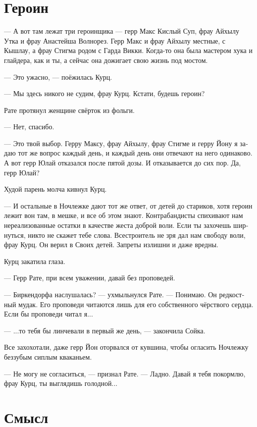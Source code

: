 \documentclass[a4paper,12pt,fleqn]{book}\usepackage{polyglossia}\setdefaultlanguage[babelshorthands=true]{russian}\setotherlanguage{english}\defaultfontfeatures{Ligatures=TeX,Mapping=tex-text}\usepackage{xcolor}\newcommand{\ml}[3]{#2}
\begin{document}
\section{Героин}

--- А вот там лежат три героинщика --- герр Макс Кислый Суп, фрау Айхылу Утка и фрау Анастейша Волнорез.
Герр Макс и фрау Айхылу местные, с Кышлау, а фрау Стигма родом с Гарда Викки.
Когда-то она была мастером хука и глайдера, как и ты, а сейчас она дожигает свою жизнь под мостом.

--- Это ужасно, --- поёжилась Курц.

--- Мы здесь никого не судим, фрау Курц.
Кстати, будешь героин?

Рате протянул женщине свёрток из фольги.

--- Нет, спасибо.

--- Это твой выбор.
Герру Максу, фрау Айхылу, фрау Стигме и герру Йону я задаю тот же вопрос каждый день, и каждый день они отвечают на него одинаково.
А вот герр Юлай отказался после пятой дозы.
И отказывается до сих пор.
Да, герр Юлай?

Худой парень молча кивнул Курц.

--- И остальные в Ночлежке дают тот же ответ, от детей до стариков, хотя героин лежит вон там, в мешке, и все об этом знают.
Контрабандисты спихивают нам нереализованные остатки в качестве жеста доброй воли.
Если ты захочешь ширнуться, никто не скажет тебе слова.
Всестроитель не зря дал нам свободу воли, фрау Курц.
Он верил в Своих детей.
Запреты излишни и даже вредны.

Курц закатила глаза.

--- Герр Рате, при всем уважении, давай без проповедей.

--- Биркендорфа наслушалась? --- ухмыльнулся Рате.
--- Понимаю.
Он редкостный мудак.
Его проповеди читаются лишь для его собственного чёрствого сердца.
Если бы проповеди читал я...

--- ...то тебя бы линчевали в первый же день, --- закончила Сойка.

Все захохотали, даже герр Йон оторвался от кувшина, чтобы огласить Ночлежку беззубым сиплым кваканьем.

--- Не могу не согласиться, --- признал Рате.
--- Ладно.
Давай я тебя покормлю, фрау Курц, ты выглядишь голодной...

\section{Смысл}
\end{document}
